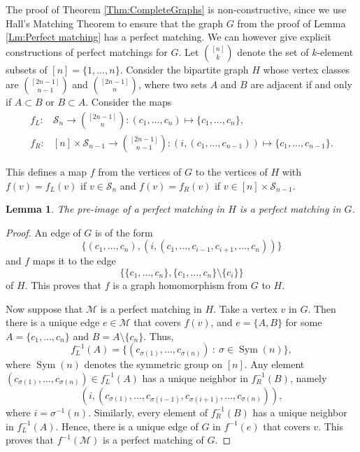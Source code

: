 \documentclass[a4paper,11pt]{amsproc}
\DeclareMathOperator{\Sym}{Sym}
\theoremstyle{plain}
\newtheorem{Lemma} [Theorem] {Lemma}
\theoremstyle{definition}
\begin{document}
The proof of Theorem \ref{Thm:CompleteGraphs} is non-constructive, since we use Hall's Matching Theorem to ensure that the graph $G$ from the proof of Lemma \ref{Lm:Perfect matching} has a perfect matching.
We can however give explicit constructions of perfect matchings for $G$.
Let $\binom{[n]}k$ denote the set of $k$-element subsets of $[n] = \{1,\dots,n\}$.
Consider the bipartite graph $H$ whose vertex classes are $\binom{[2n-1]}{n-1}$ and $\binom{[2n-1]}n$, where two sets $A$ and $B$ are adjacent if and only if $A \subset B$ or $B \subset A$.
Consider the maps
\begin{align*}
 f_L:& \mathcal S_n \to \binom{[2n-1]}{n}: (c_1,\dots,c_n) \mapsto \{c_1,\dots,c_n\}, \\
 f_R:& [n] \times \mathcal S_{n-1} \to \binom{[2n-1]}{n-1}: (i,(c_1,\dots,c_{n-1})) \mapsto \{c_1,\dots,c_{n-1}\}.
\end{align*}

This defines a map $f$ from the vertices of $G$ to the vertices of $H$ with $f(v) = f_L(v)$ if $v \in \mathcal S_n$ and $f(v) = f_R(v)$ if $v \in [n] \times \mathcal S_{n-1}$.

\begin{Lemma}
 The pre-image of a perfect matching in $H$ is a perfect matching in $G$.
\end{Lemma}

\begin{proof}
 An edge of $G$ is of the form
 \[
  \{(c_1,\dots,c_n), (i,(c_1,\dots,c_{i-1},c_{i+1},\dots,c_n))\}
 \]
 and $f$ maps it to the edge
 \[
  \{\{c_1,\dots,c_n\}, \{c_1,\dots,c_n\} \setminus \{c_i\}\}
 \]
 of $H$.
 This proves that $f$ is a graph homomorphism from $G$ to $H$.

 Now suppose that $\mathcal M$ is a perfect matching in $H$.
 Take a vertex $v$ in $G$.
 Then there is a unique edge $e \in \mathcal M$ that covers $f(v)$, and $e = \{A,B\}$ for some $A = \{c_1,\dots,c_n\}$ and $B = A \setminus \{c_n\}$.
 Thus,
 \[
  f_L^{-1}(A) = \{ (c_{\sigma(1)}, \dots, c_{\sigma(n)}) \: : \: \sigma \in \Sym(n) \},
 \]
 where $\Sym(n)$ denotes the symmetric group on $[n]$.
 Any element $(c_{\sigma(1)}, \dots, c_{\sigma(n)}) \in f_L^{-1}(A)$ has a unique neighbor in $f_R^{-1}(B)$, namely
 \[
  (i,(c_{\sigma(1)}, \dots, c_{\sigma(i-1)}, c_{\sigma(i+1)}, \dots, c_{\sigma(n)} )),
 \]
 where $i = \sigma^{-1}(n)$.
 Similarly, every element of $f_R^{-1}(B)$ has a unique neighbor in $f_L^{-1}(A)$.
 Hence, there is a unique edge of $G$ in $f^{-1}(e)$ that covers $v$.
 This proves that $f^{-1}(\mathcal M)$ is a perfect matching of $G$.
\end{proof}
\end{document}
